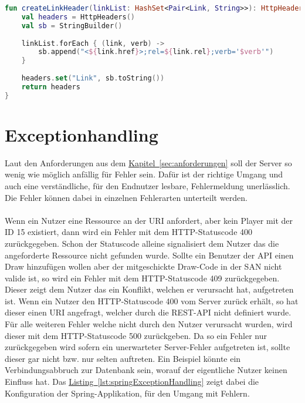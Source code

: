 \begin{lstlisting}[style=lstStyleFramed, language=Kotlin, caption={Linkaufbau mithilfe des Projektes \enquote{Spring HATEOAS}}, label=lst:createLinkHeader, float]
fun createLinkHeader(linkList: HashSet<Pair<Link, String>>): HttpHeaders {
	val headers = HttpHeaders()
	val sb = StringBuilder()
	
	linkList.forEach { (link, verb) ->
		sb.append("<${link.href}>;rel=${link.rel};verb='$verb'")
	}
	
	headers.set("Link", sb.toString())
	return headers
}
\end{lstlisting}

\section{Exceptionhandling}
Laut den Anforderungen aus dem \hyperref[sec:anforderungen]{Kapitel~\ref{sec:anforderungen}} soll der Server so wenig wie möglich anfällig für Fehler sein. Dafür ist der richtige Umgang und auch eine verständliche, für den Endnutzer lesbare, Fehlermeldung unerlässlich. Die Fehler können dabei in einzelnen Fehlerarten unterteilt werden.\\
\\
Wenn ein Nutzer eine Ressource an der \gls{URI}  anfordert, aber kein Player mit der ID 15 existiert, dann wird ein Fehler mit dem \gls{HTTP}-Statuscode 400 zurückgegeben. Schon der Statuscode alleine signalisiert dem Nutzer das die angeforderte Ressource nicht gefunden wurde. Sollte ein Benutzer der \gls{API} einen Draw hinzufügen wollen aber der mitgeschickte Draw-Code in der \gls{SAN} nicht valide ist, so wird ein Fehler mit dem \gls{HTTP}-Statuscode 409 zurückgegeben. Dieser zeigt dem Nutzer das ein Konflikt, welchen er verursacht hat, aufgetreten ist. Wenn ein Nutzer den \gls{HTTP}-Statuscode 400 vom Server zurück erhält, so hat dieser einen \gls{URI} angefragt, welcher durch die \gls{REST}-\gls{API} nicht definiert wurde. Für alle weiteren Fehler welche nicht durch den Nutzer verursacht wurden, wird dieser mit dem \gls{HTTP}-Statuscode 500 zurückgeben. Da so ein Fehler nur zurückgegeben wird sofern ein unerwarteter Server-Fehler aufgetreten ist, sollte dieser gar nicht bzw. nur selten auftreten. Ein Beispiel könnte ein Verbindungsabbruch zur Datenbank sein, worauf der eigentliche Nutzer keinen Einfluss hat. Das \hyperref[lst:springExceptionHandling]{Listing~\ref{lst:springExceptionHandling}} zeigt dabei die Konfiguration der Spring-Applikation, für den Umgang mit Fehlern.\\
